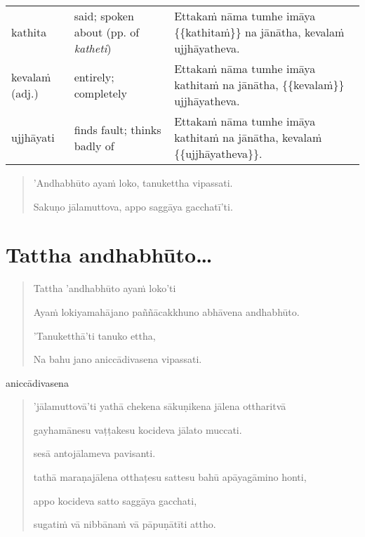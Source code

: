 \documentclass[11pt,oneside]{memoir}
\begin{document}
\begin{longtable}{L{\colOne} L{\colTwo} H}
kathita & said; spoken about (pp. of \emph{katheti}) & Ettakaṁ nāma tumhe imāya \{\{kathitaṁ\}\} na jānātha, kevalaṁ ujjhāyatheva.\\[0pt]
kevalaṁ (adj.) & entirely; completely & Ettakaṁ nāma tumhe imāya kathitaṁ na jānātha, \{\{kevalaṁ\}\} ujjhāyatheva.\\[0pt]
ujjhāyati & finds fault; thinks badly of & Ettakaṁ nāma tumhe imāya kathitaṁ na jānātha, kevalaṁ \{\{ujjhāyatheva\}\}.\\[0pt]
\end{longtable}


\clearpage

\begin{quote}
'Andhabhūto ayaṁ loko, tanukettha vipassati.

Sakuṇo jālamuttova, appo saggāya gacchatī'ti.
\end{quote}

\clearpage

\section{Tattha andhabhūto\ldots{}}
\label{sec:org35348ae}

\begin{quote}
Tattha 'andhabhūto ayaṁ loko'ti

Ayaṁ lokiyamahājano paññācakkhuno abhāvena andhabhūto.

'Tanuketthā'ti tanuko ettha,

Na bahu jano aniccādivasena vipassati.
\end{quote}

aniccādivasena


\clearpage

\begin{quote}
'jālamuttovā'ti yathā chekena sākuṇikena jālena ottharitvā

gayhamānesu vaṭṭakesu kocideva jālato muccati.

sesā antojālameva pavisanti.

tathā maraṇajālena otthaṭesu sattesu bahū apāyagāmino honti,

appo kocideva satto saggāya gacchati,

sugatiṁ vā nibbānaṁ vā pāpuṇātīti attho.
\end{quote}
\end{document}
